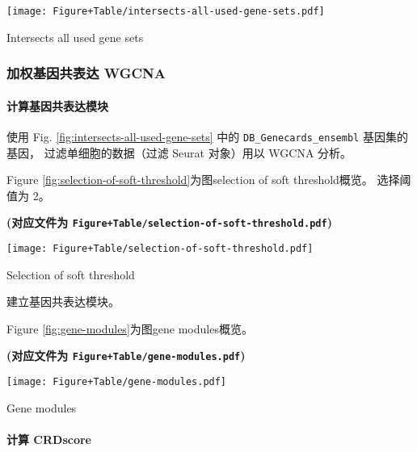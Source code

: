 \documentclass[
]{article}
\begin{document}
\def\@captype{figure}
\begin{center}
\texttt{[image: Figure+Table/intersects-all-used-gene-sets.pdf]}
\caption{Intersects all used gene sets}\label{fig:intersects-all-used-gene-sets}
\end{center}

\hypertarget{ux52a0ux6743ux57faux56e0ux5171ux8868ux8fbe-wgcna}{%
\subsubsection{加权基因共表达 WGCNA}\label{ux52a0ux6743ux57faux56e0ux5171ux8868ux8fbe-wgcna}}

\hypertarget{ux8ba1ux7b97ux57faux56e0ux5171ux8868ux8fbeux6a21ux5757}{%
\paragraph{计算基因共表达模块}\label{ux8ba1ux7b97ux57faux56e0ux5171ux8868ux8fbeux6a21ux5757}}

使用 Fig. \ref{fig:intersects-all-used-gene-sets} 中的 \texttt{DB\_Genecards\_ensembl} 基因集的基因，
过滤单细胞的数据（过滤 Seurat 对象）用以 WGCNA 分析。

Figure \ref{fig:selection-of-soft-threshold}为图selection of soft threshold概览。
选择阈值为 2。

\textbf{(对应文件为 \texttt{Figure+Table/selection-of-soft-threshold.pdf})}

\def\@captype{figure}
\begin{center}
\texttt{[image: Figure+Table/selection-of-soft-threshold.pdf]}
\caption{Selection of soft threshold}\label{fig:selection-of-soft-threshold}
\end{center}

建立基因共表达模块。

Figure \ref{fig:gene-modules}为图gene modules概览。

\textbf{(对应文件为 \texttt{Figure+Table/gene-modules.pdf})}

\def\@captype{figure}
\begin{center}
\texttt{[image: Figure+Table/gene-modules.pdf]}
\caption{Gene modules}\label{fig:gene-modules}
\end{center}

\hypertarget{crd}{%
\paragraph{计算 CRDscore}\label{crd}}
\end{document}
